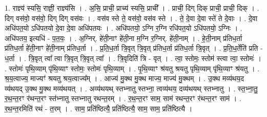 \documentclass[17pt]{extarticle}
\begin{document}
1. राज्ञ्य॑ स्यसि॒ राज्ञी॒ राज्ञ्य॑सि । . अ॒सि॒ प्राची॒ प्राच्य॑ स्यसि॒ प्राची᳚ । . प्राची॒ दिग् दिक् प्राची॒ प्राची॒ दिक् । . दिग् वस॑वो॒ वस॑वो॒ दिग् दिग् वस॑वः । . वस॑व स्ते ते॒ वस॑वो॒ वस॑व स्ते । . ते॒ दे॒वा दे॒वा स्ते॑ ते दे॒वाः । . दे॒वा अधि॑पत॒यो ऽधि॑पतयो दे॒वा दे॒वा अधि॑पतयः । . अधि॑पतयो॒ ऽग्नि र॒ग्नि रधि॑पत॒यो ऽधि॑पतयो॒ ऽग्निः । . अधि॑पतय॒ इत्यधि॑ - प॒त॒यः॒ । . अ॒ग्निर्. हे॑ती॒नाꣳ हे॑ती॒ना म॒ग्नि र॒ग्निर्. हे॑ती॒नाम् । . हे॒ती॒नाम् प्र॑तिध॒र्ता प्र॑तिध॒र्ता हे॑ती॒नाꣳ हे॑ती॒नाम् प्र॑तिध॒र्ता । . प्र॒ति॒ध॒र्ता त्रि॒वृत् त्रि॒वृत् प्र॑तिध॒र्ता प्र॑तिध॒र्ता त्रि॒वृत् । . प्र॒ति॒ध॒र्तेति॑ प्रति - ध॒र्ता । . त्रि॒वृत् त्वा᳚ त्वा त्रि॒वृत् त्रि॒वृत् त्वा᳚ । . त्रि॒वृदिति॑ त्रि - वृत् । . त्वा॒ स्तोमः॒ स्तोम॑ स्त्वा त्वा॒ स्तोमः॑ । . स्तोमः॑ पृथि॒व्याम् पृ॑थि॒व्याꣳ स्तोमः॒ स्तोमः॑ पृथि॒व्याम् । . पृ॒थि॒व्याꣳ श्र॑यतु श्रयतु पृथि॒व्याम् पृ॑थि॒व्याꣳ श्र॑यतु । . श्र॒य॒त्वाज्य॒ माज्यꣳ॑ श्रयतु श्रय॒त्वाज्य᳚म् । . आज्य॑ मु॒क्थ मु॒क्थ माज्य॒ माज्य॑ मु॒क्थम् । . उ॒क्थ मव्य॑थय॒द व्य॑थयद् उ॒क्थ मु॒क्थ मव्य॑थयत् । . अव्य॑थयथ् स्तभ्नातु स्तभ्ना॒ त्वव्य॑थय॒ दव्य॑थयथ् स्तभ्नातु । . स्त॒भ्ना॒तु॒ र॒थ॒न्त॒रꣳ र॑थन्त॒रꣳ स्त॑भ्नातु स्तभ्नातु रथन्त॒रम् । . र॒थ॒न्त॒रꣳ साम॒ साम॑ रथन्त॒रꣳ र॑थन्त॒रꣳ साम॑ । . र॒थ॒न्त॒रमिति॑ रथं - त॒रम् । . साम॒ प्रति॑ष्ठित्यै॒ प्रति॑ष्ठित्यै॒ साम॒ साम॒ प्रति॑ष्ठित्यै । \newline
\end{document}
